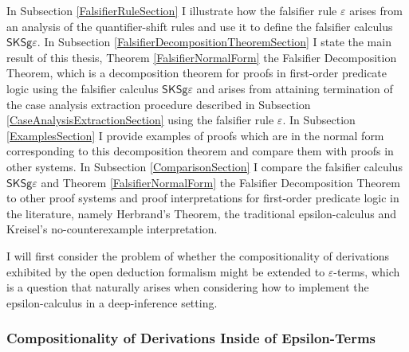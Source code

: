 \documentclass[10pt]{article}
\theoremstyle{definition}\newtheorem{remark}[theorem]{Remark}
\theoremstyle{definition}\newtheorem{example}[theorem]{Example}
\theoremstyle{definition}\newtheorem{definition}[theorem]{Definition}
\newcommand{\FalsifierCalculus}{{\mathsf{SKSg\varepsilon}}}
\newcommand{\falsifierRule}{{\mathsf{\varepsilon}}}
\begin{document}
	In Subsection \ref{FalsifierRuleSection} I illustrate how the falsifier rule $\falsifierRule$ arises from an analysis of the quantifier-shift rules and use it to define the falsifier calculus $\FalsifierCalculus$. In Subsection \ref{FalsifierDecompositionTheoremSection} I state the main result of this thesis, Theorem \ref{FalsifierNormalForm} the Falsifier Decomposition Theorem, which is a decomposition theorem for proofs in first-order predicate logic using the falsifier calculus $\FalsifierCalculus$ and arises from attaining termination of the case analysis extraction procedure described in Subsection \ref{CaseAnalysisExtractionSection} using the falsifier rule $\falsifierRule$. In Subsection \ref{ExamplesSection} I provide examples of proofs which are in the normal form corresponding to this decomposition theorem and compare them with proofs in other systems. In Subsection \ref{ComparisonSection} I compare the falsifier calculus $\FalsifierCalculus$ and Theorem \ref{FalsifierNormalForm} the Falsifier Decomposition Theorem to other proof systems and proof interpretations for first-order predicate logic in the literature, namely Herbrand's Theorem, the traditional epsilon-calculus and Kreisel's no-counterexample interpretation.
	
	I will first consider the problem of whether the compositionality of derivations exhibited by the open deduction formalism might be extended to $\varepsilon$-terms, which is a question that naturally arises when considering how to implement the epsilon-calculus in a deep-inference setting.
	
	\subsubsection*{Compositionality of Derivations Inside of Epsilon-Terms}
	
\end{document}
